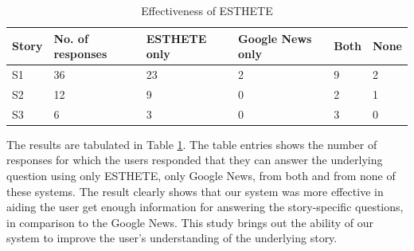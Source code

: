 \begin{table}
\small
\begin{center}
\begin{tabular}{|l|p{1.00cm}|p{1.45cm}|p{1.00cm}|p{1.00cm}|p{1.00cm}|}
\hline
{\bf Story} & {\bf No. of responses} & {\bf ESTHETE only} & {\bf Google News only} & {\bf Both} &{\bf None}\\
\hline
S1 & 36 & 23 & 2 & 9 & 2\\
S2 & 12 & 9 & 0 & 2 & 1\\
S3 & 6 & 3 & 0 & 3 & 0 \\
\hline
\end{tabular}
\end{center}
\label{tab:effectiveness}
\caption{Effectiveness of ESTHETE}
\end{table}
\normalsize
The results are tabulated in Table \ref{tab:effectiveness}. The table entries shows the number of responses for which the users responded that they can answer the underlying question using only ESTHETE, only Google News, from both and from none of these systems. The result clearly shows that our system was more effective in aiding the user get enough information for answering the story-specific questions, in comparison to the Google News. This study brings out the ability of our system to improve the user's understanding of  the underlying story.  

